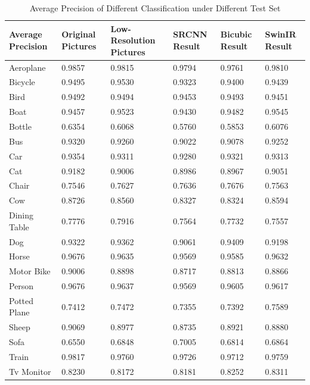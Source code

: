 \documentclass[10pt,twocolumn,letterpaper]{article}
\begin{document}
\begin{table}[h!]
\centering
\begin{minipage}{0.8\textwidth}
\centering
\begin{tabular}{ p{2cm}||p{2cm}p{2cm}p{2cm}p{2cm}p{2cm}  }
 Average Precision & Original Pictures&Low-Resolution Pictures &SRCNN Result&Bicubic Result&SwinIR Result\\
\hline
\hline
 Aeroplane   & 0.9857   & 0.9815    & 0.9794    & 0.9761    & 0.9810\\
 Bicycle     & 0.9495   & 0.9530    & 0.9323    & 0.9400    & 0.9439\\
 Bird        & 0.9492   & 0.9494    & 0.9453    & 0.9493    & 0.9451\\
 Boat        & 0.9457   & 0.9523    & 0.9430    & 0.9482    & 0.9545\\
 Bottle      & 0.6354   & 0.6068    & 0.5760    & 0.5853    & 0.6076\\
 Bus         & 0.9320   & 0.9260    & 0.9022    & 0.9078    & 0.9252\\
 Car         & 0.9354   & 0.9311    & 0.9280    & 0.9321    & 0.9313\\
 Cat         & 0.9182   & 0.9006    & 0.8986    & 0.8967    & 0.9051\\
 Chair       & 0.7546   & 0.7627    & 0.7636    & 0.7676    & 0.7563\\
 Cow         & 0.8726   & 0.8560    & 0.8327    & 0.8324    & 0.8594\\ 
 Dining Table& 0.7776   & 0.7916    & 0.7564    & 0.7732    & 0.7557\\
 Dog         & 0.9322   & 0.9362    & 0.9061    & 0.9409    & 0.9198\\
 Horse       & 0.9676   & 0.9635    & 0.9569    & 0.9585    & 0.9632\\
 Motor Bike  & 0.9006   & 0.8898    & 0.8717    & 0.8813    & 0.8866\\
 Person      & 0.9676   & 0.9637    & 0.9569    & 0.9605    & 0.9617\\
 Potted Plane& 0.7412   & 0.7472    & 0.7355    & 0.7392    & 0.7589\\
 Sheep       & 0.9069   & 0.8977    & 0.8735    & 0.8921    & 0.8880\\
 Sofa        & 0.6550   & 0.6848    & 0.7005    & 0.6814    & 0.6864\\
 Train       & 0.9817   & 0.9760    & 0.9726    & 0.9712    & 0.9759\\
 Tv Monitor  & 0.8230   & 0.8172    & 0.8181    & 0.8252    & 0.8311\\
\end{tabular} 

\end{minipage}
\caption{Average Precision of Different Classification under Different Test Set}
\label{tab:all}
\end{table}
\end{document}
